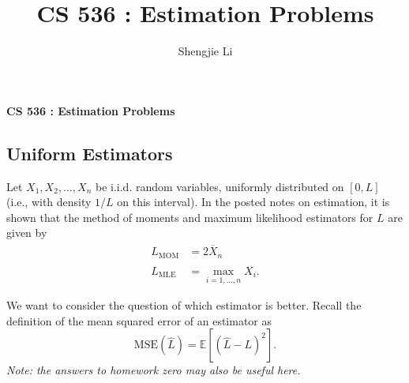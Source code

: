 \documentclass[letter, 12pt]{article}
\author{Shengjie Li}
\title{CS 536 : Estimation Problems}
\begin{document}
	\centerline{\textbf{CS 536 : Estimation Problems}}
	\subsection*{\textbf{Uniform Estimators}}
	\par{Let $ X_1 , X_2 , \dots , X_n $ be i.i.d. random variables, uniformly distributed on $ [0, L] $ (i.e., with density $ 1/L $ on this interval). In the posted notes on estimation, it is shown that the method of moments and maximum likelihood estimators for $ L $ are given by}
	\begin{equation}
		\begin{aligned}
			\hat{L}_{\text{MOM}} &= 2 \overline{X}_n \\
			\hat{L}_{\text{MLE}} &= \max_{i=1,\dots,n} X_i .
		\end{aligned}
	\end{equation}
	\par{We want to consider the question of which estimator is better. Recall the definition of the mean squared error of an estimator as}
	\begin{equation}
		\text{MSE}(\hat{L}) = \mathbb{E}[(\hat{L} - L)^2] . 
	\end{equation}
	\textit{Note: the answers to homework zero may also be useful here.}
\end{document}
